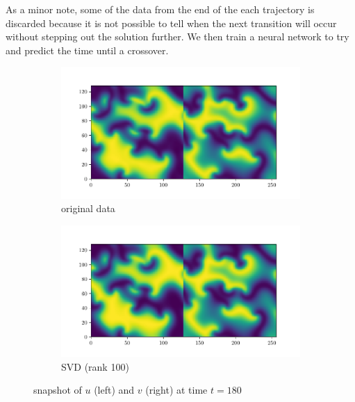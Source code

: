 \documentclass[10pt]{article}
\begin{document}
As a minor note, some of the data from the end of the each trajectory is discarded because it is not possible to tell when the next transition will occur without stepping out the solution further. We then train a neural network to try and predict the time until a crossover.
\begin{figure}[tb!]\centering
\begin{subfigure}{.45\textwidth}\centering
    \includegraphics[width=\textwidth]{img/uv_t180.pdf}
    \caption{original data}
    \label{time_image}
\end{subfigure}\hfill
\begin{subfigure}{.45\textwidth}\centering
    \includegraphics[width=\textwidth]{img/svd_t180.pdf}
    \caption{SVD (rank 100)}
    \label{SVD_time_image}
\end{subfigure}
\caption{snapshot of \( u \) (left) and \( v \) (right) at time \( t=180 \)}
\label{RD_SVD}
\end{figure}
\end{document}
